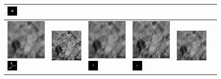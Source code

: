 \begin{figure}
\begin{tabular}{|l|l|l|l|l|l|}
\includegraphics[width=0.5cm]{results/chocolate_kernel1_MAPkreg_k.png}
\\ 
 \hline\includegraphics[width=2.5cm]{results/chocolate_kernel2_blurred.png}
\includegraphics[width=0.5cm]{images/kernel2}
& \includegraphics[width=2.5cm]{results/chocolate_kernel2_nonblind_deconv.png}
&\includegraphics[width=2.5cm]{results/chocolate_kernel2_MAPxk_x.png}
\includegraphics[width=0.5cm]{results/chocolate_kernel2_MAPxk_k.png}
&\includegraphics[width=2.5cm]{results/chocolate_kernel2_MAPk_x.png}
\includegraphics[width=0.5cm]{results/chocolate_kernel2_MAPk_k.png}
&\includegraphics[width=2.5cm]{results/chocolate_kernel2_MAPkreg_x.png}

\end{tabular}
\end{figure}
